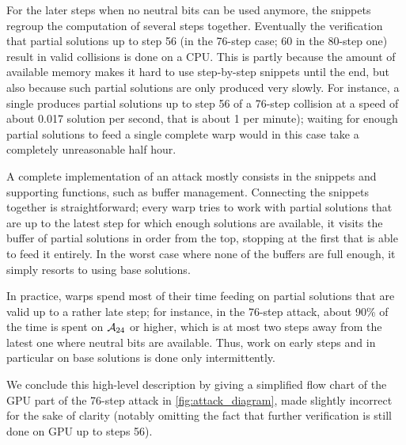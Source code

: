 For the
later steps when no neutral bits can be used anymore, the snippets regroup the computation of several steps together.
Eventually the verification that partial solutions up to step 56 (in the 76-step case; 60 in the 80-step one) result in valid collisions is done on a CPU. This is partly because
the amount of available memory makes it hard to use step-by-step snippets until the end, but also because such partial solutions are only
produced very slowly. For instance, a single \gtx produces partial solutions up to step 56 of a 76-step collision at a speed of about 0.017 solution per second, that is about
1 per minute); waiting for enough partial solutions to feed a single complete warp would in this case take a completely unreasonable half hour.

\bigskip


A complete implementation of an attack mostly consists in the snippets and supporting functions, such as buffer management.
Connecting the snippets together is straightforward; every warp tries to work with partial solutions that are up
to the latest step for which enough solutions are available, \ie it visits the buffer of partial solutions in order from the top,
stopping at the first that is able to feed it entirely.
In the worst case where none of the buffers are full enough, it simply resorts to using base solutions.

In practice, warps spend most of their time feeding on partial solutions that are valid up to a rather late step; for instance, in the 76-step attack,
about 90\% of the time is spent on $\mathcal{A}_{24}$ or higher, which is at most two steps away from the latest one where neutral bits are available.
Thus, work on early steps and in particular on base solutions is done only intermittently.

We conclude this high-level description by giving a simplified flow chart
of the GPU part of the 76-step attack in \autoref{fig:attack_diagram}, made slightly incorrect for the sake of clarity (notably omitting the fact that further verification is still done on GPU up to steps 56).

\def\rectanMac{\begin{tikzpicture}[scale=0.2]\draw (0,0) rectangle (1,1);\end{tikzpicture}}
\def\elliMac{\begin{tikzpicture}[scale=0.3,transform shape]\node[draw,ellipse] (e) at (0,0) {\phantom{toto}};\end{tikzpicture}}
\def\plainMac{\begin{tikzpicture}[scale=0.1] \draw[>=latex,->] (0,0) -- (2,2);\end{tikzpicture}}
\def\dottMac{\begin{tikzpicture}[scale=0.1] \draw[dotted,->]   (0,0) -- (2,2);\end{tikzpicture}}

